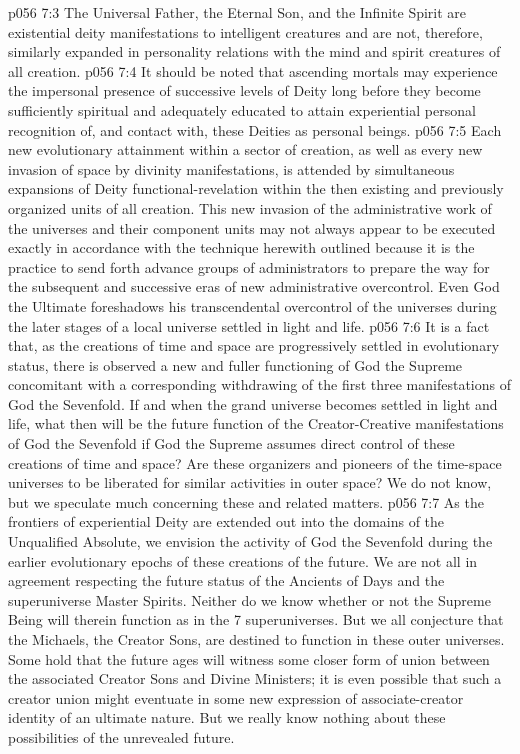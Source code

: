 \vs p056 7:3 \pc The Universal Father, the Eternal Son, and the Infinite Spirit are existential deity manifestations to intelligent creatures and are not, therefore, similarly expanded in personality relations with the mind and spirit creatures of all creation.
\vs p056 7:4 \pc It should be noted that ascending mortals may experience the impersonal presence of successive levels of Deity long before they become sufficiently spiritual and adequately educated to attain experiential personal recognition of, and contact with, these Deities as personal beings.
\vs p056 7:5 Each new evolutionary attainment within a sector of creation, as well as every new invasion of space by divinity manifestations, is attended by simultaneous expansions of Deity functional\hyp{}revelation within the then existing and previously organized units of all creation. This new invasion of the administrative work of the universes and their component units may not always appear to be executed exactly in accordance with the technique herewith outlined because it is the practice to send forth advance groups of administrators to prepare the way for the subsequent and successive eras of new administrative overcontrol. Even God the Ultimate foreshadows his transcendental overcontrol of the universes during the later stages of a local universe settled in light and life.
\vs p056 7:6 It is a fact that, as the creations of time and space are progressively settled in evolutionary status, there is observed a new and fuller functioning of God the Supreme concomitant with a corresponding withdrawing of the first three manifestations of God the Sevenfold. If and when the grand universe becomes settled in light and life, what then will be the future function of the Creator\hyp{}Creative manifestations of God the Sevenfold if God the Supreme assumes direct control of these creations of time and space? Are these organizers and pioneers of the time\hyp{}space universes to be liberated for similar activities in outer space? We do not know, but we speculate much concerning these and related matters.
\vs p056 7:7 \pc As the frontiers of experiential Deity are extended out into the domains of the Unqualified Absolute, we envision the activity of God the Sevenfold during the earlier evolutionary epochs of these creations of the future. We are not all in agreement respecting the future status of the Ancients of Days and the superuniverse Master Spirits. Neither do we know whether or not the Supreme Being will therein function as in the 7 superuniverses. But we all conjecture that the Michaels, the Creator Sons, are destined to function in these outer universes. Some hold that the future ages will witness some closer form of union between the associated Creator Sons and Divine Ministers; it is even possible that such a creator union might eventuate in some new expression of associate\hyp{}creator identity of an ultimate nature. But we really know nothing about these possibilities of the unrevealed future.
